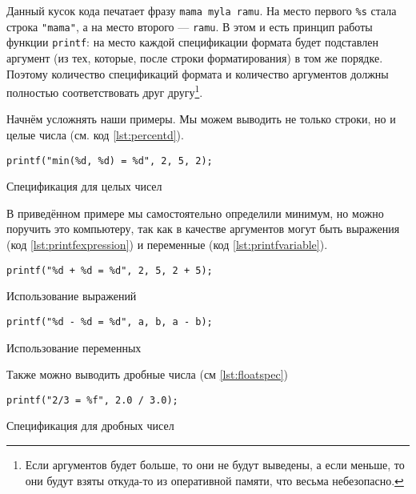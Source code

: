 \documentclass[12pt]{article}
\begin{document}
Данный кусок кода печатает фразу \verb|mama myla ramu|. На место первого \verb|%s| стала строка \verb|"mama"|, а на место второго --- \verb|ramu|. В этом и есть принцип работы функции \verb|printf|: на место каждой спецификации формата будет подставлен аргумент (из тех, которые, после строки форматирования) в том же порядке. Поэтому количество спецификаций формата и количество аргументов должны полностью соответствовать друг другу\footnote{Если аргументов будет больше, то они не будут выведены, а если меньше, то они будут взяты откуда-то из оперативной памяти, что весьма небезопасно.}.

Начнём усложнять наши примеры. Мы можем выводить не только строки, но и целые числа (см. код \ref{lst:percentd}).
\begin{listing}[ht]
\begin{center}
\begin{verbatim}
printf("min(%d, %d) = %d", 2, 5, 2);
\end{verbatim}
\end{center}
\caption{Спецификация для целых чисел}
\label{lst:percentd}
\end{listing}
В приведённом примере мы самостоятельно определили минимум, но можно поручить это компьютеру, так как в качестве аргументов могут быть выражения (код \ref{lst:printfexpression}) и переменные (код \ref{lst:printfvariable}).
\begin{listing}[ht]
\begin{center}
\begin{verbatim}
printf("%d + %d = %d", 2, 5, 2 + 5);
\end{verbatim}
\end{center}
\caption{Использование выражений}
\label{lst:printfexpression}
\end{listing}
\begin{listing}[ht]
\begin{center}
\begin{verbatim}
printf("%d - %d = %d", a, b, a - b);
\end{verbatim}
\end{center}
\caption{Использование переменных}
\label{lst:printfvariable}
\end{listing}

Также можно выводить дробные числа (см \ref{lst:floatspec})
\begin{listing}[ht]
\begin{center}
\begin{verbatim}
printf("2/3 = %f", 2.0 / 3.0);
\end{verbatim}
\end{center}
\caption{Спецификация для дробных чисел}
\label{lst:floatspec}
\end{listing}
\end{document}
